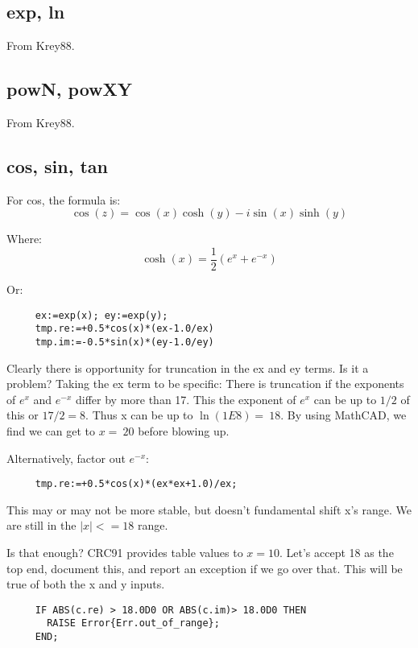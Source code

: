 \subsection*{exp, ln}
From Krey88.

\subsection*{powN, powXY}
From Krey88.


\subsection*{cos, sin, tan}
For cos, the formula is:
\begin{equation}
  \cos(z)=\cos(x)\cosh(y) - i \sin(x)\sinh(y)
\end{equation}

Where:
\begin{equation}
  \cosh(x)=\frac{1}{2}(e^{x} + e^{-x})
\end{equation}

Or:
\begin{verbatim}
     ex:=exp(x); ey:=exp(y);
     tmp.re:=+0.5*cos(x)*(ex-1.0/ex)
     tmp.im:=-0.5*sin(x)*(ey-1.0/ey)
\end{verbatim}

Clearly there is opportunity for truncation in the ex and ey
terms.  Is it a problem? Taking the ex term to be specific:
There is truncation if the exponents of $e^x$ and $e^{-x}$ differ
by more than 17.  This the exponent of $e^x$ can be up to $1/2$
of this or $17/2 = 8$.  Thus x can be up to $\ln(1E8)=~18$.  By
using MathCAD, we find we can get to $x=~20$ before blowing
up.

Alternatively, factor out $e^{-x}$:
\begin{verbatim}
     tmp.re:=+0.5*cos(x)*(ex*ex+1.0)/ex;
\end{verbatim}

This may or may not be more stable, but doesn't fundamental
shift x's range.  We are still in the $|x|<=18$ range.

Is that enough?  CRC91 provides table values to $x=10$.  Let's
accept 18 as the top end, document this, and report an
exception if we go over that.  This will be true of both the
x and y inputs.
\begin{tt} \begin{verbatim}
     IF ABS(c.re) > 18.0D0 OR ABS(c.im)> 18.0D0 THEN
       RAISE Error{Err.out_of_range};
     END;
\end{verbatim} \end{tt}

